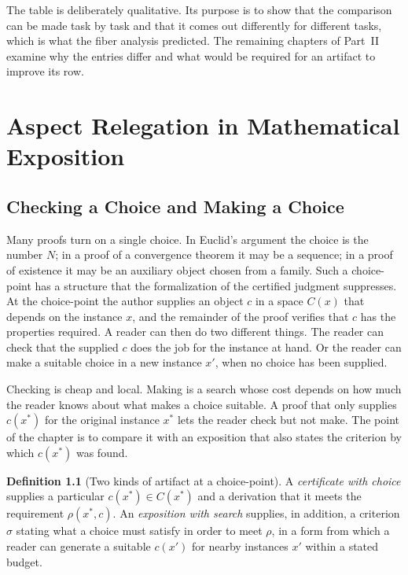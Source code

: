 \documentclass[11pt]{book}
\theoremstyle{definition}
\newtheorem{definition}[theorem]{Definition}
\theoremstyle{remark}
\begin{document}
The table is deliberately qualitative. Its purpose is to show that the comparison can be made task by task and that it comes out differently for different tasks, which is what the fiber analysis predicted. The remaining chapters of Part~II examine why the entries differ and what would be required for an artifact to improve its row.

\chapter{Aspect Relegation in Mathematical Exposition}

\section{Checking a Choice and Making a Choice}

Many proofs turn on a single choice. In Euclid's argument the choice is the number $N$; in a proof of a convergence theorem it may be a sequence; in a proof of existence it may be an auxiliary object chosen from a family. Such a choice-point has a structure that the formalization of the certified judgment suppresses. At the choice-point the author supplies an object $c$ in a space $C(x)$ that depends on the instance $x$, and the remainder of the proof verifies that $c$ has the properties required. A reader can then do two different things. The reader can check that the supplied $c$ does the job for the instance at hand. Or the reader can make a suitable choice in a new instance $x'$, when no choice has been supplied.

Checking is cheap and local. Making is a search whose cost depends on how much the reader knows about what makes a choice suitable. A proof that only supplies $c(x^\ast)$ for the original instance $x^\ast$ lets the reader check but not make. The point of the chapter is to compare it with an exposition that also states the criterion by which $c(x^\ast)$ was found.

\begin{definition}[Two kinds of artifact at a choice-point]
A \emph{certificate with choice} supplies a particular $c(x^\ast)\in C(x^\ast)$ and a derivation that it meets the requirement $\rho(x^\ast,c)$. An \emph{exposition with search} supplies, in addition, a criterion $\sigma$ stating what a choice must satisfy in order to meet $\rho$, in a form from which a reader can generate a suitable $c(x')$ for nearby instances $x'$ within a stated budget.
\end{definition}
\end{document}
